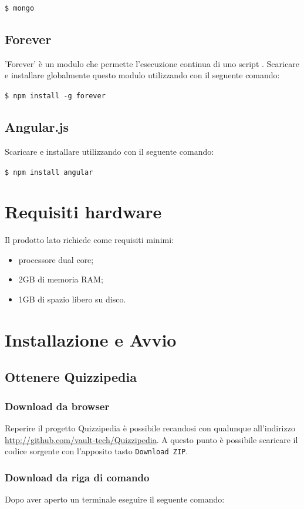 \documentclass[a4paper, titlepage]{article}
\begin{document}
	\texttt{\$ mongo}

	\subsection{Forever}
	'Forever' è un modulo  che permette l'esecuzione continua di uno script .
	Scaricare e installare globalmente questo modulo utilizzando  con il seguente comando:

	\texttt{\$ npm install -g forever}
	
	\subsection{Angular.js}
	Scaricare e installare  utilizzando  con il seguente comando:

	\texttt{\$ npm install angular}
	
	\section{Requisiti hardware}
	Il prodotto lato  richiede come requisiti minimi:
	\begin{itemize}
		\item processore dual core;
		\item 2GB di memoria RAM;
		\item 1GB di spazio libero su disco.
	\end{itemize}
	
	\section{Installazione e Avvio}
	
	\subsection{Ottenere Quizzipedia}
	\subsubsection{Download da browser}
	Reperire il progetto Quizzipedia è possibile recandosi con qualunque  all'indirizzo \url{http://github.com/vault-tech/Quizzipedia}.
	A questo punto è possibile scaricare il codice sorgente con l'apposito tasto \texttt{Download ZIP}.

	\subsubsection{Download da riga di comando}
	Dopo aver aperto un terminale eseguire il seguente comando:
\end{document}
